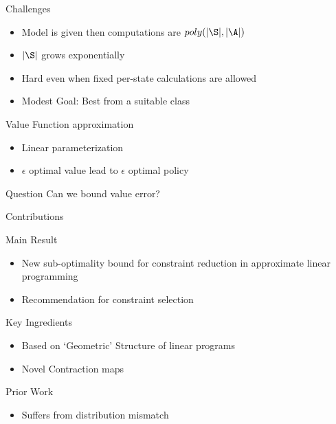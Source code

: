 \documentclass[10pt]{beamer}
\begin{document}
\begin{frame}[fragile]{Challenges}
\begin{itemize}
\item Model is given then computations are $poly(|\S|,|\A|)$
\item $|\S|$ grows exponentially
\item Hard even when fixed per-state calculations are allowed
\item Modest Goal: Best from a suitable class
\end{itemize}
\begin{block}{Value Function approximation}
\begin{itemize}
\item Linear parameterization
\item $\epsilon$ optimal value lead to $\epsilon$ optimal policy
\end{itemize}
\end{block}
\begin{block}{Question}
Can we bound value error?
\end{block}

\end{frame}


\begin{frame}[fragile]{Contributions}
\begin{block}{Main Result}
\begin{itemize}
\item New sub-optimality bound for constraint reduction in approximate linear programming
\item Recommendation for constraint selection
\end{itemize}
\end{block}
\begin{block}{Key Ingredients}
\begin{itemize}
\item Based on `Geometric' Structure of linear programs
\item Novel Contraction maps
\end{itemize}
\end{block}
\begin{block}{Prior Work}
\begin{itemize}
\item Suffers from distribution mismatch
\end{itemize}
\end{block}

\end{frame}
\end{document}
